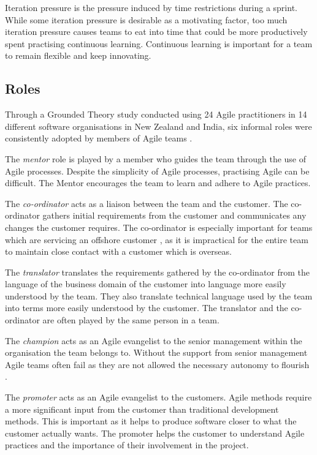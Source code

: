 \documentclass[conference]{IEEEtran}
\begin{document}
Iteration pressure is the pressure induced by time restrictions during a sprint.
While some iteration pressure is desirable as a motivating factor, too much
iteration pressure causes teams to eat into time that could be more productively
spent practising continuous learning. Continuous learning is important for a
team to remain flexible and keep innovating.

\subsection{Roles}

Through a Grounded Theory \cite{strauss1994grounded} study conducted using 24
Agile practitioners in 14 different software organisations in New Zealand and
India, six informal roles were consistently adopted by members of Agile teams
\cite{hoda2010organizing}.

The \emph{mentor} role is played by a member who guides the team through the use
of Agile processes. Despite the simplicity of Agile processes, practising Agile
can be difficult. The Mentor encourages the team to learn and adhere to Agile
practices.

The \emph{co-ordinator} acts as a liaison between the team and the customer. The
co-ordinator gathers initial requirements from the customer and communicates any
changes the customer requires. The co-ordinator is especially important for
teams which are servicing an offshore customer \cite{hoda2010organizing}, as it
is impractical for the entire team to maintain close contact with a customer
which is overseas.

The \emph{translator} translates the requirements gathered by the co-ordinator
from the language of the business domain of the customer into language more
easily understood by the team. They also translate technical language used by
the team into terms more easily understood by the customer. The translator and
the  co-ordinator are often played by the same person in a team.

The \emph{champion} acts as an Agile evangelist to the senior management within
the organisation the team belongs to. Without the support from senior management
Agile teams often fail as they are not allowed the necessary autonomy to
flourish \cite{hoda2010balancing}.

The \emph{promoter} acts as an Agile evangelist to the customers. Agile methods
require a more significant input from the customer than traditional development
methods. This is important as it helps to produce software closer to what the
customer actually wants. The promoter helps the customer to understand Agile
practices and the importance of their involvement in the project.
\end{document}
